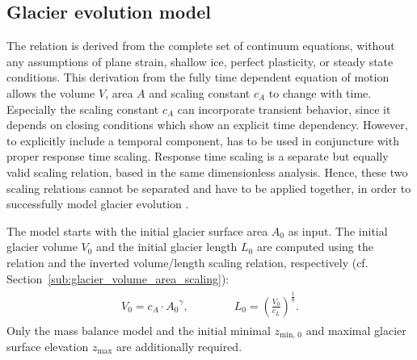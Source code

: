     \subsection{Glacier evolution model} %
    \label{sub:glacier_evolution_model}

        The \vas{} relation is derived from the complete set of continuum equations, without any assumptions of plane strain, shallow ice, perfect plasticity, or steady state conditions. This derivation from the fully time dependent equation of motion allows the volume $V$, area $A$ and scaling constant $c_A$ to change with time. Especially the scaling constant $c_A$ can incorporate transient behavior, since it depends on closing conditions which show an explicit time dependency. However, to explicitly include a temporal component, \vas{} has to be used in conjuncture with proper response time scaling. Response time scaling is a separate but equally valid scaling relation, based in the same dimensionless analysis. Hence, these two scaling relations cannot be separated and have to be applied together, in order to successfully model glacier evolution \citep{Bahr2015}.

        The \vas{} model starts with the initial glacier surface area $A_0$ as input. The initial glacier volume $V_0$ and the initial glacier length $L_0$ are computed using the \vas{} relation and the inverted volume/length scaling relation, respectively (cf. Section~\ref{sub:glacier_volume_area_scaling}):
        \begin{align}
            \begin{split}
                V_0 = c_A\cdot {A_0}^\gamma, \qquad\qquad L_0 = \left(\frac{V_0}{c_L}\right)^\frac{1}{q}.
            \end{split}
        \end{align}
        Only the mass balance model and the initial minimal $z_{\text{min, 0}}$ and maximal glacier surface elevation $z_\text{max}$ are additionally required.

